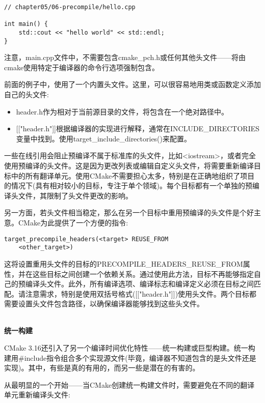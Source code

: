 \begin{lstlisting}[style=styleCXX]
// chapter05/06-precompile/hello.cpp

int main() {
	std::cout << "hello world" << std::endl;
}
\end{lstlisting} 

注意，main.cpp文件中，不需要包含cmake\_pch.h或任何其他头文件——将由cmake使用特定于编译器的命令行选项强制包含。

前面的例子中，使用了一个内置头文件。这里，可以很容易地用类或函数定义添加自己的头文件:

\begin{itemize}
\item 
header.h作为相对于当前源目录的文件，将包含在一个绝对路径中。

\item 
{}[["header.h"]]根据编译器的实现进行解释，通常在INCLUDE\_DIRECTORIES变量中找到。使用target\_include\_directories()来配置。
\end{itemize}

一些在线引用会阻止预编译不属于标准库的头文件，比如<iostream>，或者完全使用预编译的头文件。这是因为更改列表或编辑自定义头文件，将需要重新编译目标中的所有翻译单元。使用CMake不需要担心太多，特别是在正确地组织了项目的情况下(具有相对较小的目标，专注于单个领域)。每个目标都有一个单独的预编译头文件，其限制了头文件更改的影响。

另一方面，若头文件相当稳定，那么在另一个目标中重用预编译的头文件是个好主意。CMake为此提供了一个方便的指令:

\begin{lstlisting}[style=styleCMake]
target_precompile_headers(<target> REUSE_FROM
	<other_target>)
\end{lstlisting}

这将设置重用头文件的目标的PRECOMPILE\_HEADERS\_REUSE\_FROM属性，并在这些目标之间创建一个依赖关系。通过使用此方法，目标不再能够指定自己的预编译头文件。此外，所有编译选项、编译标志和编译定义必须在目标之间匹配。请注意需求，特别是使用双括号格式([["header.h"]])使用头文件。两个目标都需要设置头文件包含路径，以确保编译器能够找到这些头文件。

\hspace*{\fill} \\ %
\noindent
\textbf{统一构建}

CMake 3.16还引入了另一个编译时间优化特性——统一构建或巨型构建。统一构建用\#include指令组合多个实现源文件(毕竟，编译器不知道包含的是头文件还是实现)。其中，有些是真的有用的，而另一些是潜在的有害的。

从最明显的一个开始——当CMake创建统一构建文件时，需要避免在不同的翻译单元重新编译头文件:

